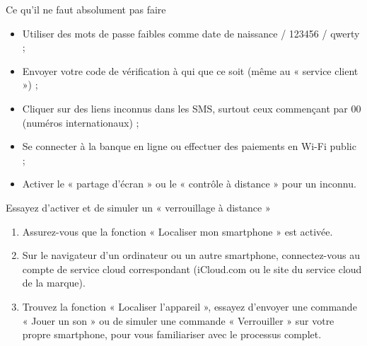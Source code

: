\begin{tcbwarn}{Ce qu'il ne faut absolument pas faire}
\begin{itemize}
  \item Utiliser des mots de passe faibles comme date de naissance / 123456 / qwerty ;
  \item Envoyer votre code de vérification à qui que ce soit (même au « service client ») ;
  \item Cliquer sur des liens inconnus dans les SMS, surtout ceux commençant par 00 (numéros internationaux) ;
  \item Se connecter à la banque en ligne ou effectuer des paiements en Wi-Fi public ;
  \item Activer le « partage d'écran » ou le « contrôle à distance » pour un inconnu.
\end{itemize}

\end{tcbwarn}

\begin{tcbpractice}{Essayez d'activer et de simuler un « verrouillage à distance »}
\begin{enumerate}
  \item Assurez-vous que la fonction « Localiser mon smartphone » est activée.
  \item Sur le navigateur d'un ordinateur ou un autre smartphone, connectez-vous au compte de service cloud correspondant (iCloud.com ou le site du service cloud de la marque).
  \item Trouvez la fonction « Localiser l'appareil », essayez d'envoyer une commande « Jouer un son » ou de simuler une commande « Verrouiller » sur votre propre smartphone, pour vous familiariser avec le processus complet.
\end{enumerate}

\end{tcbpractice}
